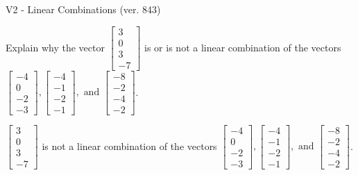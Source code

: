 \begin{exercise}
  \begin{exerciseTitle}V2 - Linear Combinations (ver. 843)\end{exerciseTitle}
  \begin{exerciseStatement}
    Explain why the vector \(\left[\begin{array}{c}
3 \\
0 \\
3 \\
-7
\end{array}\right]\)  is or is not a linear 
	combination of the vectors \(\left[\begin{array}{c}
-4 \\
0 \\
-2 \\
-3
\end{array}\right] , \left[\begin{array}{c}
-4 \\
-1 \\
-2 \\
-1
\end{array}\right] , \text{ and } \left[\begin{array}{c}
-8 \\
-2 \\
-4 \\
-2
\end{array}\right]\).
	


  \end{exerciseStatement}
  \begin{exerciseAnswer}
   \(\left[\begin{array}{c}
3 \\
0 \\
3 \\
-7
\end{array}\right]\) 
  	 is not  
	a linear combination of the vectors \(\left[\begin{array}{c}
-4 \\
0 \\
-2 \\
-3
\end{array}\right] , \left[\begin{array}{c}
-4 \\
-1 \\
-2 \\
-1
\end{array}\right] , \text{ and } \left[\begin{array}{c}
-8 \\
-2 \\
-4 \\
-2
\end{array}\right]\).

	
  


  \end{exerciseAnswer}
\end{exercise}